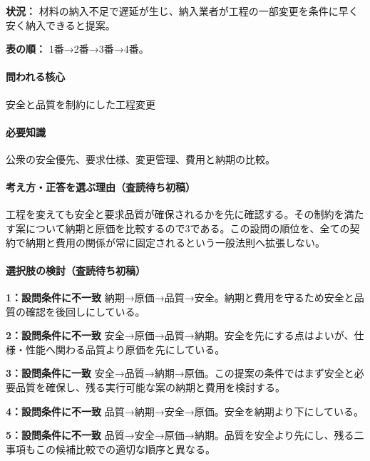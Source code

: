 \noindent\textbf{状況：} 材料の納入不足で遅延が生じ、納入業者が工程の一部変更を条件に早く安く納入できると提案。\par

\noindent\textbf{表の順：} 1番→2番→3番→4番。\par

\paragraph{問われる核心} 安全と品質を制約にした工程変更

\paragraph{必要知識} 公衆の安全優先、要求仕様、変更管理、費用と納期の比較。

\paragraph{考え方・正答を選ぶ理由（査読待ち初稿）} 工程を変えても安全と要求品質が確保されるかを先に確認する。その制約を満たす案について納期と原価を比較するので3である。この設問の順位を、全ての契約で納期と費用の関係が常に固定されるという一般法則へ拡張しない。

\paragraph{選択肢の検討（査読待ち初稿）}\mbox{}\par

\noindent\textbf{1：設問条件に不一致} 納期→原価→品質→安全。納期と費用を守るため安全と品質の確認を後回しにしている。\par

\noindent\textbf{2：設問条件に不一致} 安全→原価→品質→納期。安全を先にする点はよいが、仕様・性能へ関わる品質より原価を先にしている。\par

\noindent\textbf{3：設問条件に一致} 安全→品質→納期→原価。この提案の条件ではまず安全と必要品質を確保し、残る実行可能な案の納期と費用を検討する。\par

\noindent\textbf{4：設問条件に不一致} 品質→納期→安全→原価。安全を納期より下にしている。\par

\noindent\textbf{5：設問条件に不一致} 品質→安全→原価→納期。品質を安全より先にし、残る二事項もこの候補比較での適切な順序と異なる。\par


